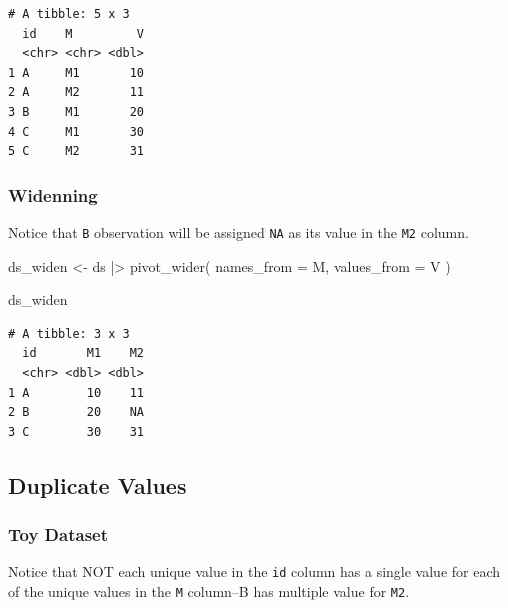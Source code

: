 \documentclass[
  letterpaper,
  DIV=11,
  numbers=noendperiod]{scrreprt}
\newenvironment{Shaded}{\begin{snugshade}}{\end{snugshade}}
\newcommand{\AttributeTok}[1]{\textcolor[rgb]{0.40,0.45,0.13}{#1}}
\newcommand{\FunctionTok}[1]{\textcolor[rgb]{0.28,0.35,0.67}{#1}}
\newcommand{\NormalTok}[1]{\textcolor[rgb]{0.00,0.23,0.31}{#1}}
\newcommand{\OtherTok}[1]{\textcolor[rgb]{0.00,0.23,0.31}{#1}}
\newcommand{\SpecialCharTok}[1]{\textcolor[rgb]{0.37,0.37,0.37}{#1}}
\begin{document}
\begin{verbatim}
# A tibble: 5 x 3
  id    M         V
  <chr> <chr> <dbl>
1 A     M1       10
2 A     M2       11
3 B     M1       20
4 C     M1       30
5 C     M2       31
\end{verbatim}

\subsubsection{Widenning}\label{widenning-1}

Notice that \texttt{B} observation will be assigned \texttt{NA} as its
value in the \texttt{M2} column.

\begin{Shaded}
\begin{Highlighting}[]
\NormalTok{ds\_widen }\OtherTok{\textless{}{-}}\NormalTok{ ds }\SpecialCharTok{|\textgreater{}} 
  \FunctionTok{pivot\_wider}\NormalTok{(}
    \AttributeTok{names\_from =}\NormalTok{ M,}
    \AttributeTok{values\_from =}\NormalTok{ V}
\NormalTok{  )}

\NormalTok{ds\_widen}
\end{Highlighting}
\end{Shaded}

\begin{verbatim}
# A tibble: 3 x 3
  id       M1    M2
  <chr> <dbl> <dbl>
1 A        10    11
2 B        20    NA
3 C        30    31
\end{verbatim}

\subsection{Duplicate Values}\label{duplicate-values}

\subsubsection{Toy Dataset}\label{toy-dataset-5}

Notice that NOT each unique value in the \texttt{id} column has a single
value for each of the unique values in the \texttt{M} column--B has
multiple value for \texttt{M2}.
\end{document}
